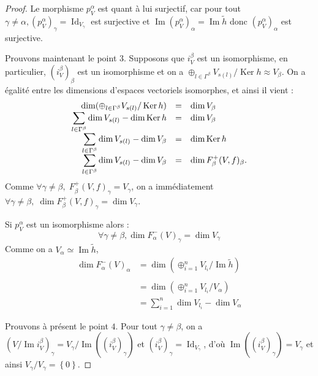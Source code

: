 \documentclass[a4paper,10pt]{article}
\DeclareMathOperator{\Ker}{Ker}
\DeclareMathOperator{\Id}{Id}
\DeclareMathOperator{\Img}{Im}
\newcommand{\dps}{\displaystyle}
\begin{document}
\begin{proof}
Le morphisme $p_{V}^{\alpha}$ est quant à lui surjectif, car pour tout $\gamma \neq \alpha, (p_{V}^{\alpha})_{\gamma} = \Id_{V_{\gamma}}$ est surjective et $ \Img (p_{V}^{\alpha})_{\alpha} = \Img \widetilde{h}$ donc $ (p_{V}^{\alpha})_{\alpha}$ est surjective.  

	Prouvons maintenant le point $3$. Supposons que $i_{V}^{\beta}$ est un isomorphisme, en particulier, $(i_{V}^{\beta})_{\beta}$ est un isomorphisme et on a $\oplus_{l\in\Gamma^{\beta}}V_{s(l)}/\Ker h\approx V_{\beta}$. On a égalité entre les dimensions d'espaces vectoriels isomorphes, et ainsi il vient :
	\[
\begin{array}{>{\dps}r>{\dps}l>{\dps}l}
	\dim(\oplus_{l\in\Gamma^{\beta}}V_{s(l)}/\Ker h) &=& \dim V_{\beta}\\
	\sum_{l\in\Gamma^{\beta}}\dim V_{s(l)}-\dim\Ker h &=& \dim V_{\beta}\\
	\sum_{l\in\Gamma^{\beta}}\dim V_{s(l)}-\dim V_{\beta} &=& \dim\Ker h\\
	\sum_{l\in\Gamma^{\beta}}\dim V_{s(l)}-\dim V_{\beta} &=& \dim F_{\beta}^{+}(V,f)_{\beta}.\\
\end{array}
	\]
	Comme $\forall \gamma\neq\beta,\;F_{\beta}^{+}(V,f)_{\gamma}=V_{\gamma}$, on a immédiatement $\forall \gamma\neq\beta,\;\dim F_{\beta}^{+}(V,f)_{\gamma}=\dim V_{\gamma}$.

        Si $p_{V}^{\alpha}$ est un isomorphisme alors : 
        \[
        \forall \gamma \neq \beta, \dim F_{\alpha}^{-}(V)_{\gamma} = \dim V_{\gamma}
        \]
        Comme on a $V_{\alpha} \simeq \Img \widetilde{h}$,
        \[
        \begin{array}{rl}
        \dim F_{\alpha}^{-}(V)_{\alpha} &= \dim\left( \oplus_{i=1}^{n} V_{l_{i}} / \Img \widetilde{h} \right) \\ \\
                                        &= \dim\left( \oplus_{i=1}^{n} V_{l_{i}} / V_{\alpha} \right) \\
                                        &= \sum_{i=1}^{n} \dim V_{l_{i}} - \dim V_{\alpha}
\end{array}
        \]


	Prouvons à présent le point $4$. Pour tout $\gamma\neq\beta$, on a $(V/\Img i_{V}^{\beta})_{\gamma}=V_{\gamma}/\Img((i_{V}^{\beta})_{\gamma})$ et $(i_{V}^{\beta})_{\gamma}=\Id_{V_{\gamma}}$, d'où $\Img((i_{V}^{\beta})_{\gamma})=V_{\gamma}$ et ainsi $V_{\gamma}/V_{\gamma}=\left\{ 0 \right\}$.


\end{proof}
\end{document}
